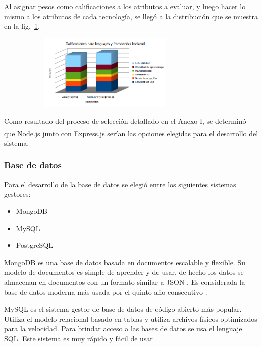 \documentclass[twoside]{article}
\begin{document}
Al asignar pesos como calificaciones a los atributos a evaluar, y luego hacer lo mismo a los atributos de cada tecnología, se llegó a la distribución que se muestra en la fig.~\ref{fig:lenguajesFrameworksBackend}.
\begin{figure}[H]
	\caption{Gráfico de calificaciones para lenguajes y frameworks backend}
    \begin{subfigure}{1\textwidth}
	\includegraphics[width=0.7\textwidth]{calificaciones para lenguajes y frameworks backend.png}
    \end{subfigure}
	\label{fig:lenguajesFrameworksBackend}
\end{figure}
\vspace{-1.0\baselineskip}
Como resultado del proceso de selección detallado en el Anexo I, se determinó que Node.js\textsuperscript{\textregistered} junto con Express.js serían las opciones elegidas para el desarrollo del sistema.
\subsubsection{Base de datos}
Para el desarrollo de la base de datos se elegió entre los siguientes sistemas gestores:
\begin{itemize}
    \item MongoDB
    \item MySQL
    \item PostgreSQL
\end{itemize}
MongoDB es una base de datos basada en documentos escalable y flexible. Su modelo de documentos es simple de aprender y de usar, de hecho los datos se almacenan en documentos con un formato similar a JSON \parencite{whatIsMongoDBOfficial}. Es considerada la base de datos moderna más usada por el quinto año consecutivo \parencite{mongoOfficialHome}.

MySQL es el sistema gestor de base de datos de código abierto más popular. Utiliza el modelo relacional basado en tablas y utiliza archivos físicos optimizados para la velocidad. Para brindar acceso a las bases de datos se usa el lenguaje SQL. Este sistema es muy rápido y fácil de usar \parencite{whatIsMySQLOracle}.
\end{document}
